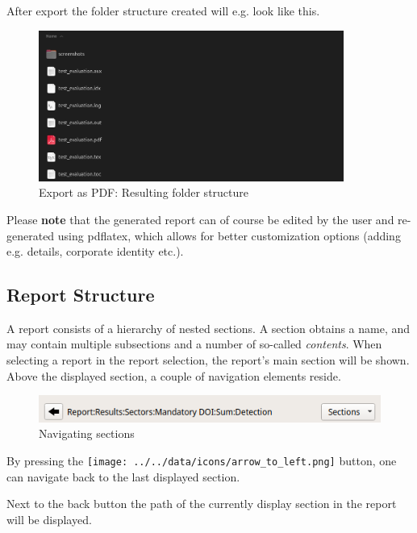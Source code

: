 After export the folder structure created will e.g. look like this.

\begin{figure}[H]
    \hspace*{-2.5cm}
    \center
    \includegraphics[width=10cm,frame]{figures/export_pdf_result.png}
  \caption{Export as PDF: Resulting folder structure}
\end{figure}

Please \textbf{note} that the generated report can of course be edited by the user and re-generated using pdflatex, 
which allows for better customization options (adding e.g. details, corporate identity etc.).

\subsection{Report Structure}

A report consists of a hierarchy of nested sections. 
A section obtains a name, and may contain multiple subsections and a number of so-called \textit{contents}.
When selecting a report in the report selection, the report's main section will be shown. \\

Above the displayed section, a couple of navigation elements reside.

\begin{figure}[H]
    \hspace*{-2.5cm}
    \center
    \includegraphics[width=12cm,frame]{figures/navigation.png}
  \caption{Navigating sections}
\end{figure}

By pressing the \texttt{[image: ../../data/icons/arrow\_to\_left.png]} button,
one can navigate back to the last displayed section.

Next to the back button the path of the currently display section in the report will be displayed.

